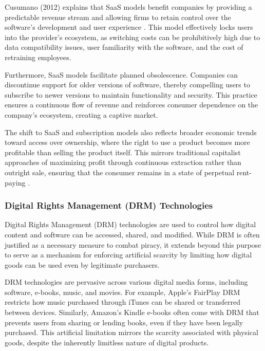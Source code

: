 \begin{refsection}
Cusumano (2012) explains that SaaS models benefit companies by providing a predictable revenue stream and allowing firms to retain control over the software’s development and user experience \cite[pp.~20-22]{cusumano2012staying}. This model effectively locks users into the provider's ecosystem, as switching costs can be prohibitively high due to data compatibility issues, user familiarity with the software, and the cost of retraining employees.

Furthermore, SaaS models facilitate planned obsolescence. Companies can discontinue support for older versions of software, thereby compelling users to subscribe to newer versions to maintain functionality and security. This practice ensures a continuous flow of revenue and reinforces consumer dependence on the company’s ecosystem, creating a captive market.

The shift to SaaS and subscription models also reflects broader economic trends toward access over ownership, where the right to use a product becomes more profitable than selling the product itself. This mirrors traditional capitalist approaches of maximizing profit through continuous extraction rather than outright sale, ensuring that the consumer remains in a state of perpetual rent-paying \cite[pp.~103-104]{shapiro1998information}.

\subsubsection{Digital Rights Management (DRM) Technologies}

Digital Rights Management (DRM) technologies are used to control how digital content and software can be accessed, shared, and modified. While DRM is often justified as a necessary measure to combat piracy, it extends beyond this purpose to serve as a mechanism for enforcing artificial scarcity by limiting how digital goods can be used even by legitimate purchasers.

DRM technologies are pervasive across various digital media forms, including software, e-books, music, and movies. For example, Apple's FairPlay DRM restricts how music purchased through iTunes can be shared or transferred between devices. Similarly, Amazon's Kindle e-books often come with DRM that prevents users from sharing or lending books, even if they have been legally purchased. This artificial limitation mirrors the scarcity associated with physical goods, despite the inherently limitless nature of digital products.


\end{refsection}

